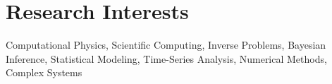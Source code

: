\section{Research Interests}

Computational Physics, Scientific Computing, Inverse Problems, Bayesian Inference,
Statistical Modeling, Time-Series Analysis, Numerical Methods, Complex Systems